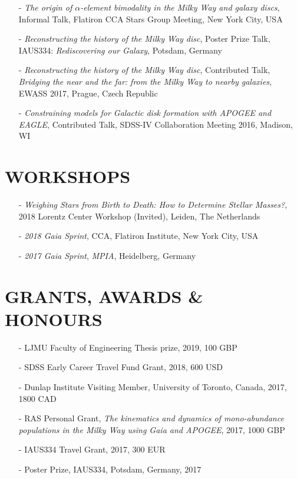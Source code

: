 \documentclass[margin]{res}
\begin{document}
\begin{resume}
\begin{itemize}
\item[-] \emph{The origin of $\alpha$-element bimodality in the Milky Way and galaxy discs}, Informal Talk, Flatiron CCA Stars Group Meeting, New York City, USA
\item[-] \emph{Reconstructing the history of the Milky Way disc}, Poster Prize Talk, IAUS334: \emph{Rediscovering our Galaxy}, Potsdam, Germany
\item[-] \emph{Reconstructing the history of the Milky Way disc}, Contributed Talk, \emph{Bridging the near and the far: from the Milky Way to nearby galaxies}, EWASS 2017, Prague, Czech Republic
\item[-] \emph{Constraining models for Galactic disk formation with APOGEE and EAGLE}, Contributed Talk, SDSS-IV Collaboration Meeting 2016, Madison, WI
\end{itemize}


\section{WORKSHOPS}
\begin{itemize}
\item[-] \emph{Weighing Stars from Birth to Death: How to Determine Stellar Masses?}, 2018 Lorentz Center Workshop (Invited), Leiden, The Netherlands
\item[-] \emph{2018 \emph{Gaia} Sprint}, CCA, Flatiron Institute, New York City, USA
\item[-] \emph{2017 \emph{Gaia} Sprint}, \emph{MPIA}, Heidelberg, Germany
\end{itemize}

\section{GRANTS, AWARDS \& HONOURS}
\begin{itemize}
\item[-] LJMU Faculty of Engineering Thesis prize, 2019, 100 GBP
\item[-] SDSS Early Career Travel Fund Grant, 2018, 600 USD
\item[-] Dunlap Institute Visiting Member, University of Toronto, Canada, 2017, 1800 CAD
\item[-] RAS Personal Grant, \emph{The kinematics and dynamics of mono-abundance populations in the Milky Way using Gaia and APOGEE}, 2017, 1000 GBP
\item[-] IAUS334 Travel Grant, 2017, 300 EUR
\item[-] Poster Prize, IAUS334, Potsdam, Germany, 2017
\end{itemize}


\end{resume}
\end{document}
